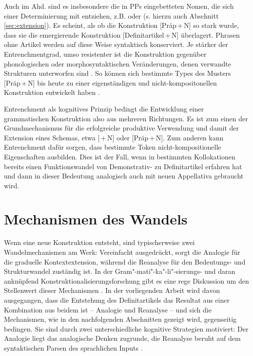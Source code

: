 Auch im Ahd. sind es insbesondere die in PPs eingebetteten Nomen, die sich einer Determinierung mit  entziehen, z.B.   oder   \parencite[84]{Oubouzar1992} (s. hierzu auch Abschnitt \ref{sec:extension}). Es scheint, als ob die Konstruktion [Präp\,+\,N] so stark  wurde, dass sie die emergierende Konstruktion [Definitartikel\,+\,N] überlagert. Phrasen ohne Artikel werden auf diese Weise syntaktisch konserviert. Je stärker der Entrenchmentgrad, umso resistenter ist die Konstruktion gegenüber phonologischen oder morphosyntaktischen Veränderungen, denen verwandte Strukturen unterworfen sind \parencite[715]{Bybee2006}. So können sich bestimmte Types des Musters [Präp\,+\,N] bis heute zu einer eigenständigen und nicht-kompositonellen Konstruktion entwickelt haben \parencite[343f.]{Himmelmann1998}. 

Entrenchment als kognitives Prinzip bedingt die Entwicklung einer grammatischen Konstruktion also aus mehreren Richtungen. Es ist zum einen der Grundmechanismus für die erfolgreiche produktive Verwendung und damit der Extension eines Schemas, etwa [\,+\,N] oder [Präp\,+\,N]. Zum anderen kann Entrenchment dafür sorgen, dass bestimmte Token nicht-kompositionelle Eigenschaften ausbilden. Dies ist der Fall, wenn  in bestimmten Kollokationen bereits einen Funktionswandel von Demonstrativ- zu Definitartikel erfahren hat und dann in dieser Bedeutung analogisch auch mit neuen Appellativa gebraucht wird. 


\section{Mechanismen des Wandels}\label{sec:mechanismen}

Wenn eine neue Konstruktion entsteht, sind typischerweise zwei Wandelmechanismen am Werk: Vereinfacht ausgedrückt, sorgt die Analogie für die graduelle Kontextextension, während die Reanalyse für den Bedeutungs- und Strukturwandel zuständig ist. In der Gram"-mati"-ka"-li"-sierungs- und daran anknüpfend  Konstruktionalisierungsforschung gibt es eine rege Diskussion um den Stellenwert dieser Mechanismen \parencite[vgl. u.a.][]{Haspelmath1998,Lehmann2004,Fischer2007}. In der vorliegenden Arbeit wird davon ausgegangen, dass die Entstehung des Definitartikels das Resultat aus einer Kombination aus beidem ist --  Analogie und Reanalyse -- und sich die Mechanismen, wie in den nachfolgenden Abschnitten gezeigt wird, gegenseitig bedingen. Sie sind durch zwei unterschiedliche kognitive Strategien motiviert: Der Analogie liegt das analogische Denken zugrunde, die Reanalyse beruht auf dem syntaktischen Parsen des sprachlichen Inputs \parencite[38]{Traugott2013}.  


